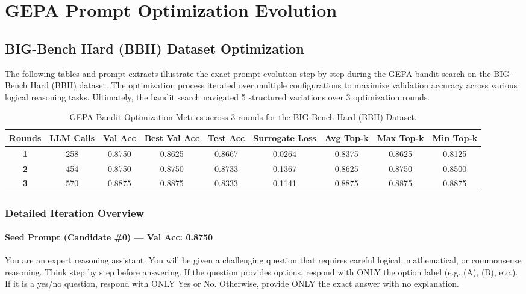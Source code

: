 \documentclass{report}
\begin{document}
\chapter{GEPA Prompt Optimization Evolution}

\section{BIG-Bench Hard (BBH) Dataset Optimization}

The following tables and prompt extracts illustrate the exact prompt evolution step-by-step during the GEPA bandit search on the BIG-Bench Hard (BBH) dataset. The optimization process iterated over multiple configurations to maximize validation accuracy across various logical reasoning tasks. Ultimately, the bandit search navigated 5 structured variations over 3 optimization rounds.

\begin{table}[htbp]
    \centering
    \begin{tabular}{ccccccccc}
    \toprule
    \textbf{Rounds} & \textbf{LLM Calls} & \textbf{Val Acc} & \textbf{Best Val Acc} & \textbf{Test Acc} & \textbf{Surrogate Loss} & \textbf{Avg Top-k} & \textbf{Max Top-k} & \textbf{Min Top-k} \\
    \midrule
    \textbf{1} & 258 & 0.8750 & 0.8625 & 0.8667 & 0.0264 & 0.8375 & 0.8625 & 0.8125 \\
    \textbf{2} & 454 & 0.8750 & 0.8750 & 0.8733 & 0.1367 & 0.8625 & 0.8750 & 0.8500 \\
    \textbf{3} & 570 & 0.8875 & 0.8875 & 0.8333 & 0.1141 & 0.8875 & 0.8875 & 0.8875 \\
    \bottomrule
    \end{tabular}
    \caption{GEPA Bandit Optimization Metrics across 3 rounds for the BIG-Bench Hard (BBH) Dataset.}
    \label{tab:bbh_metrics}
\end{table}

\subsection*{Detailed Iteration Overview}

\subsubsection*{Seed Prompt (Candidate \#0) --- Val Acc: 0.8750}
\begin{mdframed}[style=promptbox]
You are an expert reasoning assistant. You will be given a challenging question that requires careful logical, mathematical, or commonsense reasoning. Think step by step before answering. If the question provides options, respond with ONLY the option label (e.g. (A), (B), etc.). If it is a yes/no question, respond with ONLY Yes or No. Otherwise, provide ONLY the exact answer with no explanation.
\end{mdframed}
\end{document}

